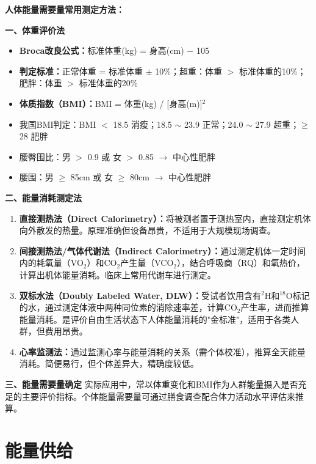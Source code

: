 \begin{tipbox}
\textbf{人体能量需要量常用测定方法：}

\textbf{一、体重评价法}
\begin{itemize}[leftmargin=*]
    \item \textbf{Broca改良公式：}标准体重(kg) = 身高(cm) $-$ 105
    \item \textbf{判定标准：}正常体重 = 标准体重 $\pm$ 10\%；超重：体重 $>$ 标准体重的10\%；肥胖：体重 $>$ 标准体重的20\%
    \item \textbf{体质指数（BMI）：}BMI = 体重(kg) / [身高(m)]$^2$
    \item 我国BMI判定：BMI $<$ 18.5 消瘦；18.5 $\sim$ 23.9 正常；24.0 $\sim$ 27.9 超重；$\geq$ 28 肥胖
    \item 腰臀围比：男 $>$ 0.9 或 女 $>$ 0.85 $\rightarrow$ 中心性肥胖
    \item 腰围：男 $\geq$ 85cm 或 女 $\geq$ 80cm $\rightarrow$ 中心性肥胖
\end{itemize}

\textbf{二、能量消耗测定法}
\begin{enumerate}[leftmargin=*]
    \item \textbf{直接测热法（Direct Calorimetry）：}将被测者置于测热室内，直接测定机体向外散发的热量。原理准确但设备昂贵，不适用于大规模现场调查。
    \item \textbf{间接测热法/气体代谢法（Indirect Calorimetry）：}通过测定机体一定时间内的耗氧量（VO$_2$）和CO$_2$产生量（VCO$_2$），结合呼吸商（RQ）和氧热价，计算出机体能量消耗。临床上常用代谢车进行测定。
    \item \textbf{双标水法（Doubly Labeled Water, DLW）：}受试者饮用含有$^2$H和$^{18}$O标记的水，通过测定体液中两种同位素的消除速率差，计算CO$_2$产生率，进而推算能量消耗。是评价自由生活状态下人体能量消耗的"金标准"，适用于各类人群，但费用昂贵。
    \item \textbf{心率监测法：}通过监测心率与能量消耗的关系（需个体校准），推算全天能量消耗。简便易行，但个体差异大，精确度较低。
\end{enumerate}

\textbf{三、能量需要量确定}
实际应用中，常以体重变化和BMI作为人群能量摄入是否充足的主要评价指标。个体能量需要量可通过膳食调查配合体力活动水平评估来推算。
\end{tipbox}

\section{能量供给}

